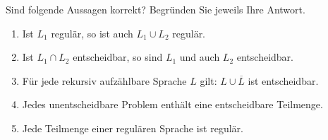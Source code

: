 \documentclass[10pt,a4paper]{scrartcl}
\newif\ifLoesung
\newcommand\Loesung[1]{\ifLoesung\begin{solution}#1\end{solution}\fi}
\begin{document}
\Loesung{

\begin{enumerate}
\item
Entscheidbar, da es mindestens eine TM gibt. Satz von Rice nicht anwendbar.
\item
Entscheidbar, wenn das Komplement von $\Sigma^*$ L=\{\} ist. Laut Satz des Rice handelt es sich hierbei um eine triviale Eigenschaft.
\item
Unentscheidbar, da die TM nur dann akzeptiert wenn sie haelt. Sie koennte auch somit nicht halten.
\item
Unentscheidbar, da es nicht entscheidbar ist, ob eine Sprache endlich viele Woerter hat. 
zB L=\{\} Komplement von L = $\Sigma^*$ somit unendlich... nicht trivial
L=$\Sigma^+$ und das Komplement von L=\{$\epsilon$\} ... ist trivial
\item
Entscheidbar, da jede Sprache Woerter von $\Sigma^*$ enthaelt.

\end{enumerate}

}
\begin{question} Sind folgende Aussagen korrekt? Begr\"unden Sie jeweils Ihre Antwort.

\begin{enumerate}
\item Ist $L_1$ regul\"ar, so ist auch $L_1 \cup L_2$ regul\"ar.

\item Ist $L_1\cap L_2$ entscheidbar, so sind $L_1$ und auch $L_2$ entscheidbar.

\item F\"ur jede rekursiv aufz\"ahlbare Sprache $L$ gilt: $L \cup \overline{L}$ ist entscheidbar.

\item Jedes unentscheidbare Problem enth\"alt eine entscheidbare Teilmenge.

\item Jede Teilmenge einer regul\"aren Sprache ist regul\"ar.
\end{enumerate}

\end{question}
\end{document}
